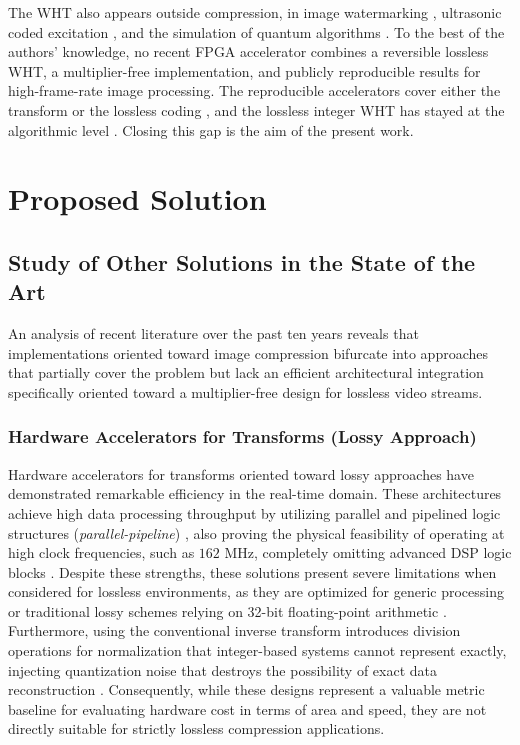 \documentclass[conference]{IEEEtran}
\begin{document}
The WHT also appears outside compression, in image watermarking \cite{ho2003}, ultrasonic
coded excitation \cite{weng2024}, and the simulation of quantum algorithms
\cite{kobori2020}. To the best of the authors' knowledge, no recent FPGA accelerator combines
a reversible lossless WHT, a multiplier-free implementation, and publicly
reproducible results for high-frame-rate image processing.
The reproducible accelerators cover either the transform \cite{manjarres2021} or the
lossless coding \cite{regorsek2024}, and the lossless integer WHT has stayed at the
algorithmic level \cite{jung1997,komatsu2001}. Closing this gap is the aim of the present
work.






\section{Proposed Solution}
\subsection{Study of Other Solutions in the State of the Art}

An analysis of recent literature over the past ten years reveals that implementations oriented 
toward image compression bifurcate into approaches that partially cover the problem but lack 
an efficient architectural integration specifically oriented toward a multiplier-free design 
for lossless video streams.

\subsubsection{Hardware Accelerators for Transforms (Lossy Approach)}
Hardware accelerators for transforms oriented toward lossy approaches have demonstrated 
remarkable efficiency in the real-time domain. These architectures achieve high data processing 
throughput by utilizing parallel and pipelined logic structures (\textit{parallel-pipeline}) \cite{manjarres2021},
also proving the physical feasibility of operating at high clock frequencies, such as $162\text{ MHz}$,
completely omitting advanced DSP logic blocks \cite{hafizullah2018}. Despite these strengths, 
these solutions present severe limitations when considered for lossless environments, as they
are optimized for generic processing or traditional lossy schemes relying on 32-bit 
floating-point arithmetic \cite{manjarres2021}. Furthermore, using the conventional inverse 
transform introduces division operations for normalization that integer-based systems cannot 
represent exactly, injecting quantization noise that destroys the possibility of exact data 
reconstruction \cite{jung1997}. Consequently, while these designs represent a valuable metric
baseline for evaluating hardware cost in terms of area and speed, they are not
directly suitable for strictly lossless compression applications.
\end{document}
